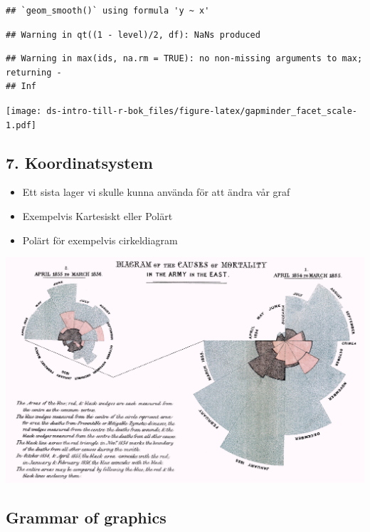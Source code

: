 \documentclass[
]{book}
\providecommand{\tightlist}{%
  \setlength{\itemsep}{0pt}\setlength{\parskip}{0pt}}
\begin{document}
\begin{verbatim}
## `geom_smooth()` using formula 'y ~ x'
\end{verbatim}

\begin{verbatim}
## Warning in qt((1 - level)/2, df): NaNs produced
\end{verbatim}

\begin{verbatim}
## Warning in max(ids, na.rm = TRUE): no non-missing arguments to max; returning -
## Inf
\end{verbatim}

\texttt{[image: ds-intro-till-r-bok\_files/figure-latex/gapminder\_facet\_scale-1.pdf]}

\hypertarget{koordinatsystem}{%
\subsection{7. Koordinatsystem}\label{koordinatsystem}}

\begin{itemize}
\tightlist
\item
  Ett sista lager vi skulle kunna använda för att ändra vår graf
\item
  Exempelvis Kartesiskt eller Polärt
\item
  Polärt för exempelvis cirkeldiagram
\end{itemize}

\includegraphics{images/Nightingale-mortality.jpg}

\hypertarget{grammar-of-graphics}{%
\subsection{Grammar of graphics}\label{grammar-of-graphics}}
\end{document}
